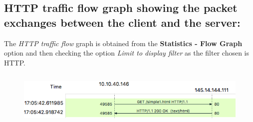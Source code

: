 \documentclass[]{report}
\begin{document}
\subsection{HTTP traffic flow graph showing the packet exchanges between the client and the server:}
The \textit{HTTP traffic flow} graph is obtained from the \textbf{Statistics - Flow Graph} option and then checking the option \textit{Limit to display filter} as the filter chosen is HTTP.
\begin{figure}[H]
	\vspace{0pt}
	\includegraphics[height = 75pt, keepaspectratio]{Snapshots/q1/simple1/1_9.png}
\end{figure}
\end{document}
